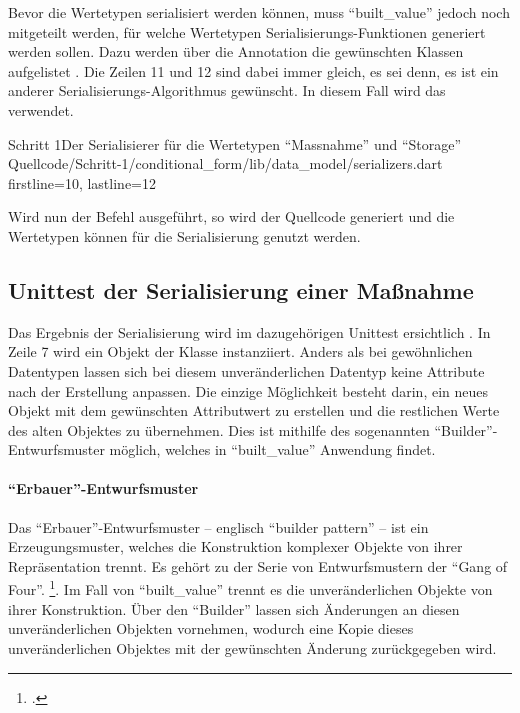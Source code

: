 \clearpage
Bevor die Wertetypen serialisiert werden können, muss \enquote{built_value} jedoch noch mitgeteilt werden, für welche Wertetypen Serialisierungs-Funktionen generiert werden sollen.
Dazu werden über die Annotation  die gewünschten Klassen aufgelistet .
Die Zeilen 11 und 12 sind dabei immer gleich, es sei denn, es ist ein anderer Serialisierungs-Algorithmus gewünscht.
In diesem Fall wird das  verwendet.

\begin{alexlisting}{Schritt 1}{Der Serialisierer für die Wertetypen \enquote{Massnahme} und \enquote{Storage}}
  {Quellcode/Schritt-1/conditional_form/lib/data_model/serializers.dart}
  {firstline=10, lastline=12}
  \label{lst:Schritt1Serialisierer}
\end{alexlisting}

Wird nun der Befehl   ausgeführt, so wird der Quellcode generiert und die Wertetypen können für die Serialisierung genutzt werden.

\subsection{Unittest der Serialisierung einer Maßnahme}

Das Ergebnis der Serialisierung wird im dazugehörigen Unittest ersichtlich \Lst{\ref{lst:SerialisierungEinerMassnahmeUnittest}}.
In Zeile 7 wird ein Objekt der Klasse  instanziiert.
Anders als bei gewöhnlichen Datentypen lassen sich bei diesem unveränderlichen Datentyp keine Attribute nach der Erstellung anpassen.
Die einzige Möglichkeit besteht darin, ein neues Objekt  mit dem gewünschten Attributwert zu erstellen und die restlichen Werte des alten Objektes zu übernehmen.
Dies ist mithilfe des sogenannten \enquote{Builder}-Entwurfsmuster möglich, welches in \enquote{built_value} Anwendung findet.

\paragraph{\enquote{Erbauer}-Entwurfsmuster} Das \enquote{Erbauer}-Entwurfsmuster -- englisch \enquote{builder pattern} -- ist ein Erzeugungsmuster, welches die Konstruktion komplexer Objekte von ihrer Repräsentation trennt.
Es gehört zu der Serie von Entwurfsmustern der \enquote{Gang of Four}. \footcite[Vgl.][S. 119]{gamma2009entwurfsmuster}.
Im Fall von \enquote{built_value} trennt es die unveränderlichen Objekte von ihrer Konstruktion.
Über den \enquote{Builder} lassen sich Änderungen an diesen unveränderlichen Objekten vornehmen, wodurch eine Kopie dieses unveränderlichen Objektes mit der gewünschten Änderung zurückgegeben wird.

